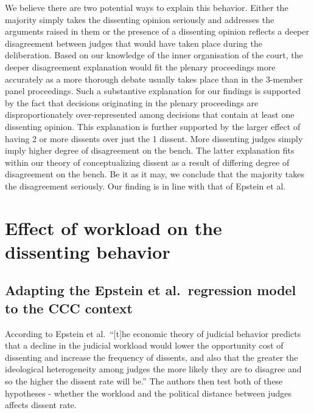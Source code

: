 \documentclass[
  11pt,
]{article}
\begin{document}
We believe there are two potential ways to explain this behavior. Either
the majority simply takes the dissenting opinion seriously and addresses
the arguments raised in them or the presence of a dissenting opinion
reflects a deeper disagreement between judges that would have taken
place during the deliberation. Based on our knowledge of the inner
organisation of the court, the deeper disagreement explanation would fit
the plenary proceedings more accurately as a more thorough debate
usually takes place than in the 3-member panel proceedings. Such a
substantive explanation for our findings is supported by the fact that
decisions originating in the plenary proceedings are disproportionately
over-represented among decisions that contain at least one dissenting
opinion. This explanation is further supported by the larger effect of
having 2 or more dissents over just the 1 dissent. More dissenting
judges simply imply higher degree of disagreement on the bench. The
latter explanation fits within our theory of conceptualizing dissent as
a result of differing degree of disagreement on the bench. Be it as it
may, we conclude that the majority takes the disagreement seriously. Our
finding is in line with that of Epstein et al.

\hypertarget{effect-of-workload-on-the-dissenting-behavior}{%
\section{Effect of workload on the dissenting
behavior}\label{effect-of-workload-on-the-dissenting-behavior}}

\hypertarget{adapting-the-epstein-et-al.-regression-model-to-the-ccc-context-1}{%
\subsection{Adapting the Epstein et al.~regression model to the CCC
context}\label{adapting-the-epstein-et-al.-regression-model-to-the-ccc-context-1}}

According to Epstein et al.~``{[}t{]}he economic theory of judicial
behavior predicts that a decline in the judicial workload would lower
the opportunity cost of dissenting and increase the frequency of
dissents, and also that the greater the ideological heterogeneity among
judges the more likely they are to disagree and so the higher the
dissent rate will be.'' The authors then test both of these hypotheses -
whether the workload and the political distance between judges affects
dissent rate.
\end{document}
